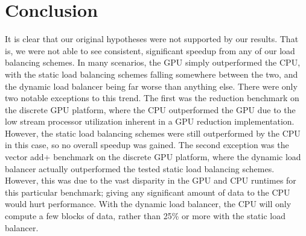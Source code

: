 \documentclass[journal]{IEEEtran}
\begin{document}
%





\section{Conclusion}
It is clear that our original hypotheses were not supported by our results.  That
is, we were not able to see consistent, significant speedup from any of our load
balancing schemes.  In many scenarios, the GPU simply outperformed the CPU, with
the static load balancing schemes falling somewhere between the two, and the dynamic
load balancer being far worse than anything else.  There were only two notable
exceptions to this trend.  The first was the reduction benchmark on the discrete GPU
platform, where the CPU outperformed the GPU due to the low stream processor utilization
inherent in a GPU reduction implementation.  However, the static load balancing schemes
were still outperformed by the CPU in this case, so no overall speedup was gained. The
second exception was the vector add+ benchmark on the discrete GPU platform, where the
dynamic load balancer actually outperformed the tested static load balancing schemes.
However, this was due to the vast disparity in the GPU and CPU runtimes for this
particular benchmark; giving any significant amount of data to the CPU would hurt
performance.  With the dynamic load balancer, the CPU will only compute a few blocks
of data, rather than 25\% or more with the static load balancer.
\end{document}
